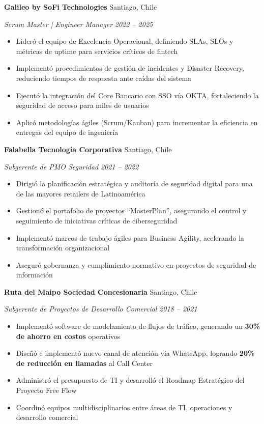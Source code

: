 \documentclass[11pt,letterpaper]{article}
\newcommand{\entry}[4]{%
  \noindent\textbf{#1} \hfill #2 \par\nopagebreak
  \textit{#3} \hfill \textit{#4} \par\nopagebreak
}
\begin{document}
\entry{Galileo by SoFi Technologies}{Santiago, Chile}{Scrum Master | Engineer Manager}{2022 -- 2025}
\begin{itemize}
  \item Lider\'{o} el equipo de Excelencia Operacional, definiendo SLAs, SLOs y m\'{e}tricas de uptime para servicios cr\'{i}ticos de fintech
  \item Implement\'{o} procedimientos de gesti\'{o}n de incidentes y Disaster Recovery, reduciendo tiempos de respuesta ante ca\'{i}das del sistema
  \item Ejecut\'{o} la integraci\'{o}n del Core Bancario con SSO v\'{i}a OKTA, fortaleciendo la seguridad de acceso para miles de usuarios
  \item Aplic\'{o} metodolog\'{i}as \'{a}giles (Scrum/Kanban) para incrementar la eficiencia en entregas del equipo de ingenier\'{i}a
\end{itemize}
\vspace{0.3em}

\entry{Falabella Tecnolog\'{i}a Corporativa}{Santiago, Chile}{Subgerente de PMO Seguridad}{2021 -- 2022}
\begin{itemize}
  \item Dirigi\'{o} la planificaci\'{o}n estrat\'{e}gica y auditor\'{i}a de seguridad digital para una de las mayores retailers de Latinoam\'{e}rica
  \item Gestion\'{o} el portafolio de proyectos ``MasterPlan'', asegurando el control y seguimiento de iniciativas cr\'{i}ticas de ciberseguridad
  \item Implement\'{o} marcos de trabajo \'{a}giles para Business Agility, acelerando la transformaci\'{o}n organizacional
  \item Asegur\'{o} gobernanza y cumplimiento normativo en proyectos de seguridad de informaci\'{o}n
\end{itemize}
\vspace{0.3em}

\entry{Ruta del Maipo Sociedad Concesionaria}{Santiago, Chile}{Subgerente de Proyectos de Desarrollo Comercial}{2018 -- 2021}
\begin{itemize}
  \item Implement\'{o} software de modelamiento de flujos de tr\'{a}fico, generando un \textbf{30\% de ahorro en costos} operativos
  \item Dise\~{n}\'{o} e implement\'{o} nuevo canal de atenci\'{o}n v\'{i}a WhatsApp, logrando \textbf{20\% de reducci\'{o}n en llamadas} al Call Center
  \item Administr\'{o} el presupuesto de TI y desarroll\'{o} el Roadmap Estrat\'{e}gico del Proyecto Free Flow
  \item Coordin\'{o} equipos multidisciplinarios entre \'{a}reas de TI, operaciones y desarrollo comercial
\end{itemize}
\vspace{0.3em}
\end{document}
